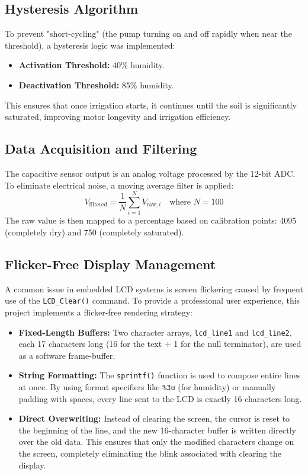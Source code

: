 \subsection{Hysteresis Algorithm}
To prevent "short-cycling" (the pump turning on and off rapidly when near the threshold), a hysteresis logic was implemented:
\begin{itemize}
    \item \textbf{Activation Threshold:} 40\% humidity.
    \item \textbf{Deactivation Threshold:} 85\% humidity.
\end{itemize}
This ensures that once irrigation starts, it continues until the soil is significantly saturated, improving motor longevity and irrigation efficiency.

\subsection{Data Acquisition and Filtering}
The capacitive sensor output is an analog voltage processed by the 12-bit ADC. To eliminate electrical noise, a moving average filter is applied:
\begin{equation}
    V_{\text{filtered}} = \frac{1}{N} \sum_{i=1}^{N} V_{\text{raw},i} \quad \text{where } N=100
\end{equation}
The raw value is then mapped to a percentage based on calibration points: 4095 (completely dry) and 750 (completely saturated).

\subsection{Flicker-Free Display Management}
A common issue in embedded LCD systems is screen flickering caused by frequent use of the \texttt{LCD\_Clear()} command. To provide a professional user experience, this project implements a flicker-free rendering strategy:
\begin{itemize}
    \item \textbf{Fixed-Length Buffers:} Two character arrays, \texttt{lcd\_line1} and \texttt{lcd\_line2}, each 17 characters long (16 for the text + 1 for the null terminator), are used as a software frame-buffer.
    \item \textbf{String Formatting:} The \texttt{sprintf()} function is used to compose entire lines at once. By using format specifiers like \texttt{\%3u} (for humidity) or manually padding with spaces, every line sent to the LCD is exactly 16 characters long.
    \item \textbf{Direct Overwriting:} Instead of clearing the screen, the cursor is reset to the beginning of the line, and the new 16-character buffer is written directly over the old data. This ensures that only the modified characters change on the screen, completely eliminating the blink associated with clearing the display.
\end{itemize}


